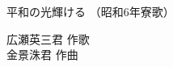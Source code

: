 \documentclass[10pt,b5j]{tarticle} %
\begin{document}
\begin{minipage}[c]{0.7\hsize} %
    \begin{center}
        {\LARGE
            平和の光輝ける %
        }
        {\small 
            （昭和6年寮歌） %
        }
    \end{center}
\end{minipage}
\begin{minipage}[c]{0.3\hsize} %
    \begin{flushright} %
        広瀬英三君 作歌\\金景洙君 作曲 %
    \end{flushright}
\end{minipage}
\end{document}
